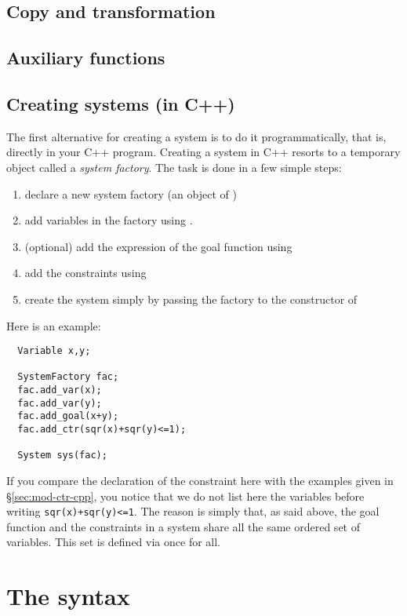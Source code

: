\subsection{Copy and transformation}\label{sec:mod-sys-transfo}

\subsection{Auxiliary functions}\label{sec:mod-sys-auxfunc}

\subsection{Creating systems (in C++)}

The first alternative for creating a system is to do it programmatically, that is, directly in your C++ program.
Creating a system in C++ resorts to a temporary object called a {\it system factory}. The task is done in a few simple steps:
\begin{enumerate}
\item declare a new system factory (an object of )
\item add variables in the factory using .
\item (optional) add the expression of the goal function using 
\item add the constraints using 
\item create the system simply by passing the factory to the constructor of 
\end{enumerate}

Here is an example:

\begin{lstlisting}
  Variable x,y;

  SystemFactory fac;
  fac.add_var(x);
  fac.add_var(y);
  fac.add_goal(x+y);
  fac.add_ctr(sqr(x)+sqr(y)<=1);

  System sys(fac);
\end{lstlisting}

If you compare the declaration of the constraint here with the examples given in \S\ref{sec:mod-ctr-cpp},
you notice that we do not list here the variables before writing {\tt sqr(x)+sqr(y)<=1}.
The reason is simply that, as said above, the goal function and the constraints in a system
share all the same ordered set of variables. This set is defined via  once for all.

\section{The \quimper syntax}\label{sec:mod-sys-load}

